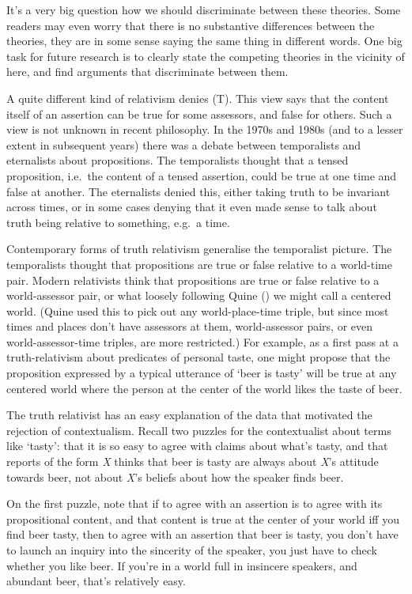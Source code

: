 \documentclass[
  10pt,
  letterpaper,
  DIV=11,
  numbers=noendperiod,
  twoside]{scrartcl}
\begin{document}
It's a very big question how we should discriminate between these
theories. Some readers may even worry that there is no substantive
differences between the theories, they are in some sense saying the same
thing in different words. One big task for future research is to clearly
state the competing theories in the vicinity of here, and find arguments
that discriminate between them.

A quite different kind of relativism denies (T). This view says that the
content itself of an assertion can be true for some assessors, and false
for others. Such a view is not unknown in recent philosophy. In the
1970s and 1980s (and to a lesser extent in subsequent years) there was a
debate between temporalists and eternalists about propositions. The
temporalists thought that a tensed proposition, i.e.~the content of a
tensed assertion, could be true at one time and false at another. The
eternalists denied this, either taking truth to be invariant across
times, or in some cases denying that it even made sense to talk about
truth being relative to something, e.g.~a time.

Contemporary forms of truth relativism generalise the temporalist
picture. The temporalists thought that propositions are true or false
relative to a world-time pair. Modern relativists think that
propositions are true or false relative to a world-assessor pair, or
what loosely following Quine () we might
call a centered world. (Quine used this to pick out any world-place-time
triple, but since most times and places don't have assessors at them,
world-assessor pairs, or even world-assessor-time triples, are more
restricted.) For example, as a first pass at a truth-relativism about
predicates of personal taste, one might propose that the proposition
expressed by a typical utterance of `beer is tasty' will be true at any
centered world where the person at the center of the world likes the
taste of beer.

The truth relativist has an easy explanation of the data that motivated
the rejection of contextualism. Recall two puzzles for the contextualist
about terms like `tasty': that it is so easy to agree with claims about
what's tasty, and that reports of the form \emph{X} thinks that beer is
tasty are always about \emph{X}'s attitude towards beer, not about
\emph{X}'s beliefs about how the speaker finds beer.

On the first puzzle, note that if to agree with an assertion is to agree
with its propositional content, and that content is true at the center
of your world iff you find beer tasty, then to agree with an assertion
that beer is tasty, you don't have to launch an inquiry into the
sincerity of the speaker, you just have to check whether you like beer.
If you're in a world full in insincere speakers, and abundant beer,
that's relatively easy.
\end{document}
